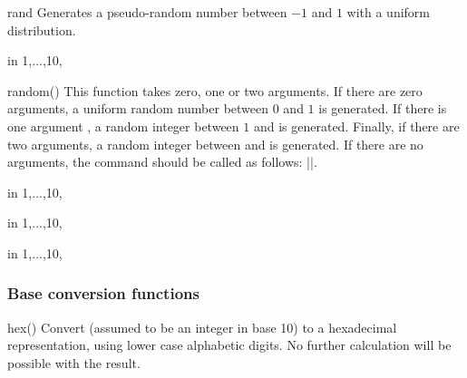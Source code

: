 \begin{math-function}{rand}
\mathcommand
    Generates a pseudo-random number between $-1$ and $1$ with a uniform
    distribution.
\begin{codeexample}[pre={\pgfmathsetseed{1}}]
\foreach \x in {1,...,10}{\pgfmathresult, }
\end{codeexample}
\end{math-function}

\begin{math-function}{random()}
\mathcommand
    This function takes zero, one or two arguments. If there are zero
    arguments, a uniform random number between $0$ and $1$ is generated. If
    there is one argument , a random integer between $1$ and 
    is generated. Finally, if there are two arguments, a random integer between
     and  is generated. If there are no arguments, the
    \pgfname{} command should be called as follows: |\pgfmathrandom{}|.
\begin{codeexample}[pre={\pgfmathsetseed{1}}]
\foreach \x in {1,...,10}{\pgfmathresult, }
\end{codeexample}

\begin{codeexample}[pre={\pgfmathsetseed{1}}]
\foreach \x in {1,...,10}{\pgfmathresult, }
\end{codeexample}

\begin{codeexample}[pre={\pgfmathsetseed{1}}]
\foreach \x in {1,...,10}{\pgfmathresult, }
\end{codeexample}
\end{math-function}


\subsubsection{Base conversion functions}
\label{pgfmath-functions-base}

\begin{math-function}{hex()}
\mathcommand
    Convert  (assumed to be an integer in base 10) to a hexadecimal
    representation, using lower case alphabetic digits. No further calculation
    will be possible with the result.
\begin{codeexample}[]
 \pgfmathresult
\end{codeexample}
\end{math-function}

